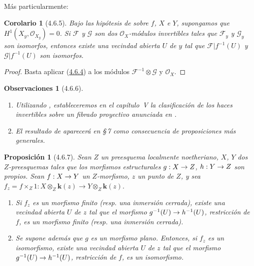 \documentclass[10pt,oneside,openany]{book}
\theoremstyle{egaenv}\newtheorem*{env}{---}
\theoremstyle{egastatement}
\newtheorem*{proposition}{Proposición}
\newtheorem*{corollary}{Corolario}
\theoremstyle{egadescription}
\newtheorem*{remarks}{Observaciones}
\renewcommand{\to}{\mathchoice{\longrightarrow}{\rightarrow}{\rightarrow}{\rightarrow}}
\begin{document}
Más particularmente:

\begin{corollary}[4.6.5]
\label{III.4.6.5}
\label{III.4.6.5-fr}
Bajo las hipótesis de  sobre $f$, $X$ e $Y$,
supongamos que
$H^1(X_y,\mathcal O_{X_y})=0$.
Si $\mathcal F$ y $\mathcal G$ son dos $\mathcal O_X$-módulos invertibles tales
que $\mathcal F_y$ y $\mathcal G_y$ son isomorfos, entonces existe una vecindad
abierta $U$ de $y$
tal que $\mathcal F|f^{-1}(U)$ y $\mathcal G|f^{-1}(U)$ son isomorfos.
\end{corollary}

\begin{proof}
Basta aplicar (\hyperref[III.4.6.4-fr]{4.6.4}) a los módulos
$\mathcal F^{-1}\otimes\mathcal G$ y $\mathcal O_X$.
\end{proof}

\begin{remarks}[4.6.6]
\label{III.4.6.6}
\label{III.4.6.6-fr}
\begin{enumerate}
\item[(i)] Utilizando , estableceremos en el capítulo~V
  la clasificación de los haces invertibles sobre un fibrado proyectivo
  anunciada en .
\item[(ii)] El resultado de  aparecerá en \S\,7 como
  consecuencia de proposiciones más generales.
\end{enumerate}
\end{remarks}

\begin{proposition}[4.6.7]
\label{III.4.6.7-fr}
Sean $Z$ un preesquema localmente noetheriano, $X$, $Y$ dos $Z$-preesquemas
tales que los morfismos estructurales $g:X\to Z$, $h:Y\to Z$ son propios.
Sean $f:X\to Y$ un $Z$-morfismo, $z$ un punto de $Z$, y sea
$f_z=f\times_Z1:
X\otimes_Z\boldsymbol{k}(z)\longrightarrow Y\otimes_Z\boldsymbol{k}(z)$.
\begin{enumerate}
\item[\textup{(i)}] Si $f_z$ es un morfismo finito \textup{(resp.} una inmersión cerrada),
existe una vecindad abierta $U$ de $z$ tal que el morfismo
$g^{-1}(U)\to h^{-1}(U)$, restricción de $f$, es un morfismo finito \textup{(resp.}
una inmersión cerrada).
\item[\textup{(ii)}] Se supone además que $g$ es un morfismo plano. Entonces, si
$f_z$ es un isomorfismo, existe una vecindad abierta $U$ de $z$ tal que
el morfismo $g^{-1}(U)\to h^{-1}(U)$, restricción de $f$, es un
isomorfismo.
\end{enumerate}
\end{proposition}
\end{document}
